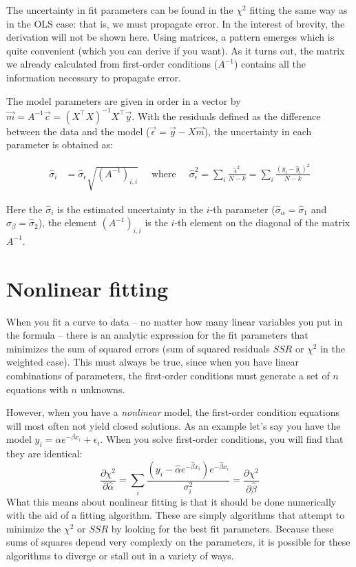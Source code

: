 The uncertainty in fit parameters can be found in the $\chi^2$ fitting the same way as in the OLS case: that is, we must propagate error. In the interest of brevity, the derivation will not be shown here. Using matrices, a pattern emerges which is quite convenient (which you can derive if you want).  As it turns out, the matrix we already calculated from first-order conditions ($A^{-1}$) contains all the information necessary to propagate error.

The model parameters are given in order in a vector by  $\vec m = A^{-1}\vec c =  (X^\intercal X)^{-1} X^\intercal \vec y$. With the residuals defined as the difference between the data and the model ($\vec \epsilon = \vec y - X \vec m $), the uncertainty in each parameter is obtained as:

\begin{align}
\hat \sigma_{i} &= \hat \sigma_\epsilon \sqrt{ (A^{-1})_{i,i}} \; \; &\mbox{where}\; \;  &\hat \sigma_\epsilon^2 = \sum_i \frac{\hat \epsilon^2}{N-k} = \sum_i \frac{(y_i - \hat y_i)^2}{N-k}
\end{align}

Here the $\hat \sigma_i$ is the estimated uncertainty in the $i$-th parameter ($\hat \sigma_\alpha = \hat \sigma_1$ and $\hat \sigma_\beta = \hat \sigma_2$), the element $(A^{-1})_{i,i}$ is the $i$-th element on the diagonal of the matrix $A^{-1}$.


\section{Nonlinear fitting}

When you fit a curve to data -- no matter how many linear variables you put in the formula -- there is an analytic expression for the fit parameters that minimizes the sum of squared errors (sum of squared residuals $SSR$ or $\chi^2$ in the weighted case). This must always be true, since when you have linear combinations of parameters, the first-order conditions must generate a set of $n$ equations with $n$ unknowns. 

However, when you have a \emph{nonlinear} model, the first-order condition equations will most often not yield closed solutions. As an example let's say you have the model $y_i = \alpha e^{-\beta x_i} + \epsilon_i$. When you solve first-order conditions, you will find that they are identical:
\begin{equation}
\frac{\partial \chi^2}{\partial \hat \alpha} = \sum_i \frac{(y_i - \hat \alpha e^{-\hat \beta x_i})e^{-\hat \beta x_i}}{\sigma_i^2} = \frac{\partial \chi^2}{\partial \hat \beta}
\end{equation}
What this means about nonlinear fitting is that it should be done numerically with the aid of a fitting algorithm. These are simply algorithms that attempt to minimize the $\chi^2$ or $SSR$ by looking for the best fit parameters. Because these sums of squares depend very complexly on the parameters, it is possible for these algorithms to diverge or stall out in a variety of ways.
